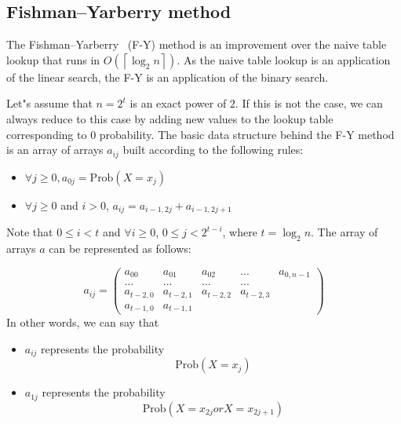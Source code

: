 \documentclass[justified, sixbynine]{tufte-book}
\theoremstyle{plain}%
\newtheorem * {corollary}{Corollary}
\theoremstyle{definition}
\theoremstyle{remark}
\newtheorem * {remark}{Remark}
\newtheorem * {note}{Note}
\begin{document}
\begin{fullwidth}
\goodbreak\subsection{Fishman--Yarberry method}

The Fishman--Yarberry~\cite{fishman}  (F-Y) method is an improvement over the naive table
lookup that runs in $O(\left\lceil \log _2n\right\rceil )$. As the naive
table lookup is an application of the linear search, the F-Y is an
application of the binary search.

Let"s assume that $n=2^t$ is an exact power of $2$. If this is not the case, 
we can always reduce to this case by adding new values to the lookup table
corresponding to $0$ probability. The basic data structure behind the F-Y
method is an array of arrays $a_{ij}$ built according to the following rules:

\begin{itemize}
\item  $\forall j\geq 0, a_{0j}=\textrm{Prob}(X=x_j)$

\item  $\forall j\geq 0$ and $i>0$, $a_{ij}=a_{i-1, 2j}+a_{i-1, 2j+1}$
\end{itemize}

Note that $0\leq i<t$ and $\forall i\geq 0$, $0\leq j<2^{t-i}$, where $t=\log
_2n$. The array of arrays $a$ can be represented as follows:

\begin{equation}
a_{ij}=\left(
\begin{array}{lllll}
a_{00} & a_{01} & a_{02} & ... & a_{0, n-1} \\
... & ... & ... & ... &  \\
a_{t-2, 0} & a_{t-2, 1} & a_{t-2, 2} & a_{t-2, 3} &  \\
a_{t-1, 0} & a_{t-1, 1} &  &  &
\end{array}
\right)
\end{equation}
In other words, we can say that

\begin{itemize}
\item  $a_{ij}$ represents the probability
\begin{equation}
\textrm{Prob}(X=x_j)
\end{equation}

\item  $a_{1j}$ represents the probability
\begin{equation}
\textrm{Prob}(X=x_{2j}orX=x_{2j+1})
\end{equation}


\end{itemize}
\end{fullwidth}
\end{document}
